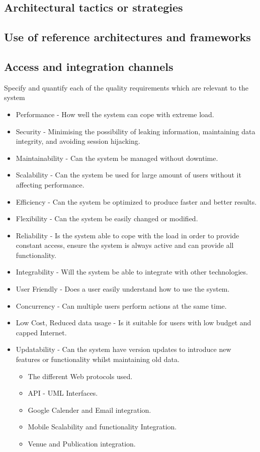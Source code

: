 \documentclass[a4paper]{article}
\begin{document}
	\subsection{Architectural tactics or strategies}

	\subsection{Use of reference architectures and frameworks}
	\subsection{Access and integration channels}
	Specify and quantify each of the quality requirements which are relevant to the system
	\begin{itemize}
		\item Performance - How well the system can cope with extreme load.
		\item Security - Minimising the possibility of leaking information, maintaining data integrity, and avoiding session hijacking.
		\item Maintainability - Can the system be managed without downtime.
		\item Scalability - Can the system be used for large amount of users without it affecting performance.
		\item Efficiency - Can the system be optimized to produce faster and better results.
		\item Flexibility - Can the system be easily changed or modified.
		\item Reliability - Is the system able to cope with the load in order to  provide constant access, ensure the system is always active and can provide all functionality.
		\item Integrability - Will the system be able to integrate with other technologies.
		\item User Friendly - Does a user easily understand how to use the system.
		\item Concurrency - Can multiple users perform actions at the same time.
		\item Low Cost, Reduced data usage - Is it suitable for users with low budget and capped Internet.
		\item Updatability - Can the system have version updates to introduce new features or functionality whilst maintaining old data.
		\\
			\begin{itemize}
				\item The different Web protocols used.
				\item API - UML Interfaces.
				\item Google Calender and Email integration.
				\item Mobile Scalability and functionality Integration.
				\item Venue and Publication integration.
				\\
			\end{itemize}
	\end{itemize}
	
\end{document}
